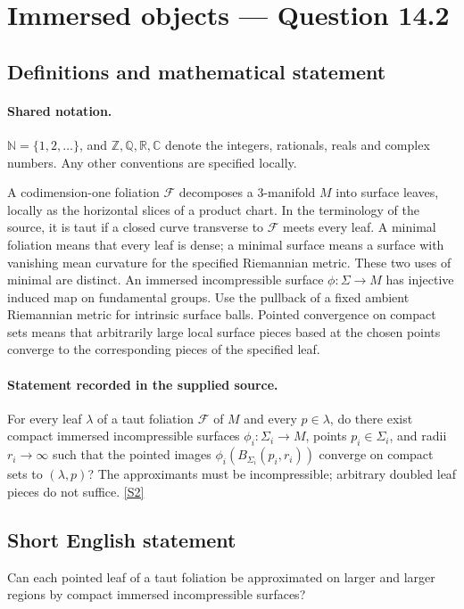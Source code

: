 \documentclass[11pt]{article}
\newcommand{\sref}[2]{\hyperlink{source:#1:#2}{[S#2]}}
\begin{document}
\section{Immersed objects — Question 14.2}\label{statement}

\subsection{Definitions and mathematical statement}

\paragraph{Shared notation.}$\mathbb N=\{1,2,\ldots\}$, and $\mathbb Z,\mathbb Q,\mathbb R,\mathbb C$ denote the integers, rationals, reals and complex numbers. Any other conventions are specified locally.


A codimension-one foliation $\mathcal F$ decomposes a $3$-manifold $M$ into surface leaves, locally as the horizontal slices of a product chart. In the terminology of the source, it is taut if a closed curve transverse to $\mathcal F$ meets every leaf. A minimal foliation means that every leaf is dense; a minimal surface means a surface with vanishing mean curvature for the specified Riemannian metric. These two uses of minimal are distinct. An immersed incompressible surface $\phi:\Sigma\to M$ has injective induced map on fundamental groups. Use the pullback of a fixed ambient Riemannian metric for intrinsic surface balls. Pointed convergence on compact sets means that arbitrarily large local surface pieces based at the chosen points converge to the corresponding pieces of the specified leaf.
\paragraph{Statement recorded in the supplied source.}
For every leaf $\lambda$ of a taut foliation $\mathcal F$ of $M$ and every $p\in\lambda$, do there exist compact immersed incompressible surfaces $\phi_i:\Sigma_i\to M$, points $p_i\in\Sigma_i$, and radii $r_i\to\infty$ such that the pointed images $\phi_i(B_{\Sigma_i}(p_i,r_i))$ converge on compact sets to $(\lambda,p)$? The approximants must be incompressible; arbitrary doubled leaf pieces do not suffice. \sref{statement}{2}
\subsection{Short English statement}
Can each pointed leaf of a taut foliation be approximated on larger and larger regions by compact immersed incompressible surfaces?
\end{document}
